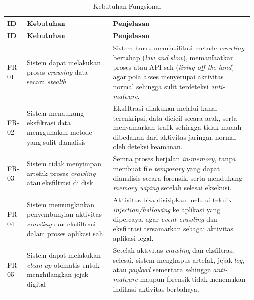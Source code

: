 \begin{longtable}{|p{1.5cm}|p{5cm}|p{7cm}|}
\caption{Kebutuhan Fungsional}
\label{tbl:kebutuhan-fungsional} \\
\hline
\textbf{ID} & \textbf{Kebutuhan} & \textbf{Penjelasan} \\
\hline
\endfirsthead

\hline
\textbf{ID} & \textbf{Kebutuhan} & \textbf{Penjelasan} \\
\hline
\endhead

\hline
\endfoot

FR-01 &
Sistem dapat melakukan proses \textit{crawling} data secara \textit{stealth} &
Sistem harus memfasilitasi metode \textit{crawling} bertahap (\textit{low and slow}), 
memanfaatkan proses atau API sah (\textit{living off the land}) agar pola akses menyerupai aktivitas normal 
sehingga sulit terdeteksi \textit{anti-malware}. \\
\hline

FR-02 &
Sistem mendukung eksfiltrasi data menggunakan metode yang sulit dianalisis &
Eksfiltrasi dilakukan melalui kanal terenkripsi, 
data dicicil secara acak, serta menyamarkan trafik sehingga tidak mudah dibedakan dari aktivitas jaringan normal oleh deteksi keamanan. \\
\hline

FR-03 &
Sistem tidak menyimpan artefak proses \textit{crawling} atau eksfiltrasi di disk &
Semua proses berjalan \textit{in-memory}, tanpa membuat file \textit{temporary} yang dapat dianalisis secara forensik, 
serta mendukung \textit{memory wiping} setelah selesai eksekusi. \\
\hline

FR-04 &
Sistem memungkinkan penyembunyian aktivitas \textit{crawling} dan eksfiltrasi dalam proses aplikasi sah &
Aktivitas bisa disisipkan melalui teknik \textit{injection/hollowing} ke aplikasi yang dipercaya, 
agar \textit{event crawling} dan eksfiltrasi tersamarkan sebagai aktivitas aplikasi legal. \\
\hline

FR-05 &
Sistem dapat melakukan \textit{clean up} otomatis untuk menghilangkan jejak digital &
Setelah aktivitas \textit{crawling} dan eksfiltrasi selesai, sistem menghapus artefak, jejak \textit{log}, atau \textit{payload} sementara 
sehingga \textit{anti-malware} maupun forensik tidak menemukan indikasi aktivitas berbahaya. \\
\hline

\end{longtable}